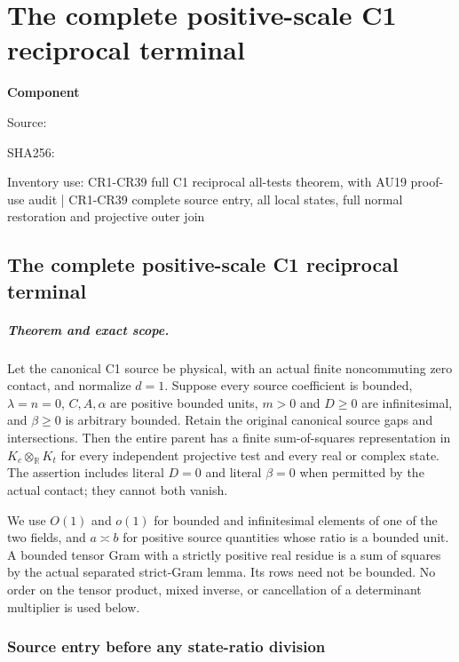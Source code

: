 \chapter{The complete positive-scale C1 reciprocal terminal}
\label{component:p98f24864b071}
\noindent\textbf{Component }\par
{\small\noindent Source: \par}
{\small\noindent SHA256: \par}
{\small\noindent Inventory use: CR1-CR39 full C1 reciprocal all-tests theorem, with AU19 proof-use audit | CR1-CR39 complete source entry, all local states, full normal restoration and projective outer join\par}
\medskip
\section{The complete positive-scale C1 reciprocal terminal}
\label{p98f24864b071:sec:c1-reciprocal-rederived}

\paragraph{Theorem and exact scope.}
Let the canonical C1 source be physical, with an actual finite
noncommuting zero contact, and normalize $d=1$. Suppose every source
coefficient is bounded, $\lambda=n=0$, $C,A,\alpha$ are positive
bounded units, $m>0$ and $D\geq0$ are infinitesimal, and
$\beta\geq0$ is arbitrary bounded. Retain the original canonical
source gaps and intersections. Then the entire parent has a finite
sum-of-squares representation in $K_c\otimes_{\mathbb R}K_t$ for
every independent projective test and every real or complex state.
The assertion includes literal $D=0$ and literal $\beta=0$ when
permitted by the actual contact; they cannot both vanish.

We use $O(1)$ and $o(1)$ for bounded and infinitesimal elements of
one of the two fields, and $a\asymp b$ for positive source quantities
whose ratio is a bounded unit. A bounded tensor Gram with a strictly
positive real residue is a sum of squares by the actual separated
strict-Gram lemma. Its rows need not be bounded. No order on the tensor
product, mixed inverse, or cancellation of a determinant multiplier is
used below.

\subsection{Source entry before any state-ratio division}

